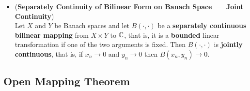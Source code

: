 \documentclass[11pt]{article}
\begin{document}
\begin{itemize}
\item \begin{corollary} (\textbf{Separately Continuity of Bilinear Form on Banach Space $=$ Joint Continuity}) \citep{reed1980methods}\\
Let $X$ and $Y$ be Banach spaces and let $B(\cdot,  \cdot)$ be a \textbf{separately continuous bilinear mapping} from $X \times Y$ to ${\mathbb C}$, that is, it is a \textbf{bounded} linear transformation if one of the two arguments is fixed. Then $B(\cdot,  \cdot)$ is \textbf{jointly continuous}, that is, if $x_n \rightarrow 0$ and  $y_n \rightarrow 0$ then $B(x_n, y_n) \rightarrow 0$. 
\end{corollary}
\end{itemize}

\subsection{Open Mapping Theorem}
\end{document}
